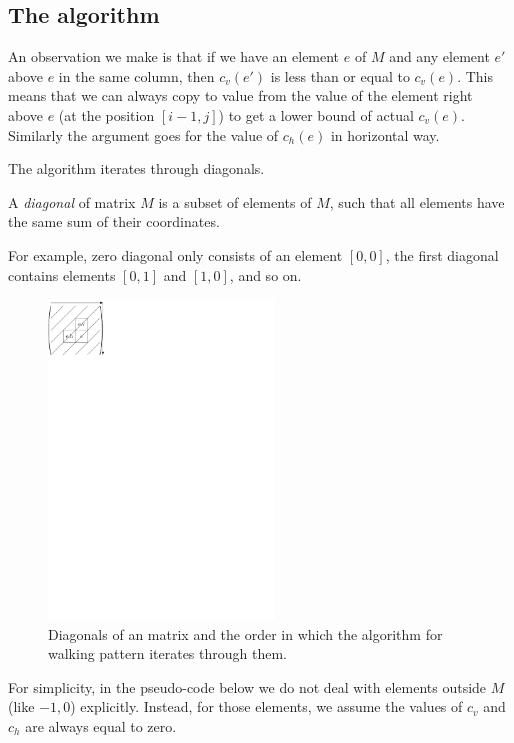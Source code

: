 \subsection{The algorithm}
An observation we make is that if we have an element $e$ of $M$ and any element $e'$ above $e$ in the same column, then $c_v(e')$ is less than or equal to $c_v(e)$. This means that we can always copy to value from the value of the element right above $e$ (at the position $[i-1,j]$) to get a lower bound of actual $c_v(e)$. Similarly the argument goes for the value of $c_h(e)$ in horizontal way.

The algorithm iterates through diagonals. 
\begin{defn}
A \emph{diagonal} of matrix $M$ is a subset of elements of $M$, such that all elements have the same sum of their coordinates.
\end{defn}
For example, zero diagonal only consists of an element $[0,0]$, the first diagonal contains elements $[0,1]$ and $[1,0]$, and so on.
\begin{figure}[h!]
\centering
\includegraphics[width=60mm]{../img/walking_alg.pdf}
\caption{Diagonals of an matrix and the order in which the algorithm for walking pattern iterates through them.}
\end{figure}

For simplicity, in the pseudo-code below we do not deal with elements outside $M$ (like $-1,0$) explicitly. Instead, for those elements, we assume the values of $c_v$ and $c_h$ are always equal to zero.

